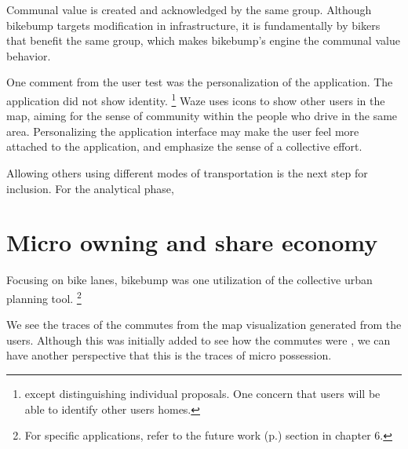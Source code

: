 Communal value is created and acknowledged by the same group.  Although bikebump targets modification in
infrastructure, it is fundamentally by bikers that benefit the same group, which makes bikebump's engine the communal value behavior. 

One comment from the user test was the personalization of the application.
The application did not show identity.
\footnote{except distinguishing individual proposals.
One concern that users will be able to identify other users homes.} 
Waze uses icons to show other users in the map, aiming for the sense
of community within the people who drive in the same area.
Personalizing the application interface may make the user feel
more attached to the application, and emphasize the sense of a collective effort.

Allowing others using different modes of transportation is the next step for inclusion. For the analytical phase, 

\section{Micro owning and share economy}

Focusing on bike lanes, bikebump was one utilization of
the collective urban planning tool.  
\footnote{For specific applications, refer to the future work (p.\pageref{sec:future}) section in chapter 6.} 

We see the traces of the commutes from the map visualization generated from the users.
Although this was initially added to see how the commutes were ,
we can have another perspective that this is the traces of micro possession.

